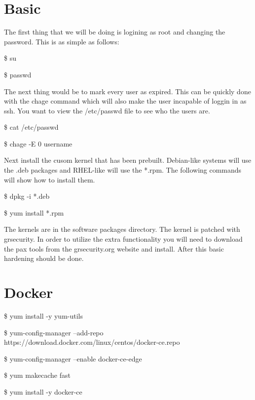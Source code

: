 \section{Basic}
  The first thing that we will be doing is logining as root and changing the password. This is as simple as follows:

  \$ su

  \$ passwd

  The next thing would be to mark every user as expired. This can be quickly done with the chage command which will also make the user incapable of loggin in as ssh. You want to view the /etc/passwd file to see who the users are.

  \$ cat /etc/passwd

  \$ chage -E 0 username

  Next install the cusom kernel that has been prebuilt. Debian-like systems will use the .deb packages and RHEL-like will use the *.rpm. The following commands will show how to install them.

  \$ dpkg -i *.deb

  \$ yum install *.rpm

  The kernels are in the software packages directory. The kernel is patched with grsecurity. In order to utilize the extra functionality you will need to download the pax tools from the grsecurity.org website and install. After this basic hardening should be done.

\section{Docker}
  \$ yum install -y yum-utils

  \$ yum-config-manager --add-repo https://download.docker.com/linux/centos/docker-ce.repo

  \$ yum-config-manager --enable docker-ce-edge

  \$ yum makecache fast
  
  \$ yum install -y docker-ce
